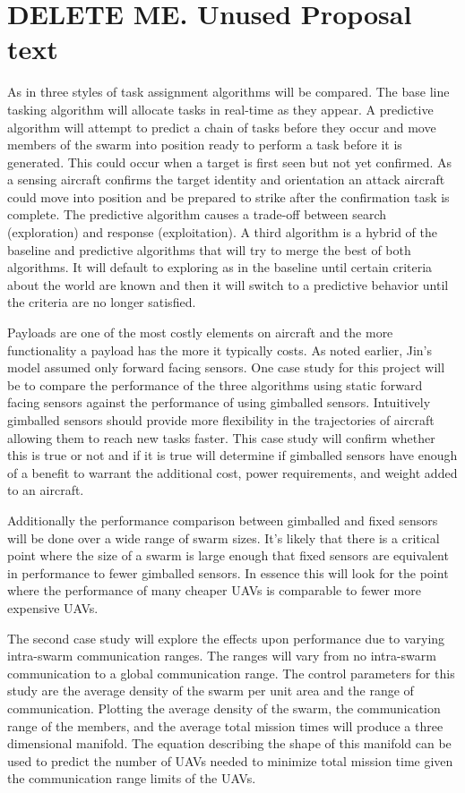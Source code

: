 \chapter{DELETE ME. Unused Proposal text}

As in \cite{jin} three styles of task assignment algorithms will be compared.  The base line tasking algorithm will allocate tasks in real-time as they appear.   A predictive algorithm will attempt to predict a chain of tasks before they occur and move members of the swarm into position ready to perform a task before it is generated.  This could occur when a target is first seen but not yet confirmed.   As a sensing aircraft confirms the target identity and orientation an attack aircraft could move into position and be prepared to strike after the confirmation task is complete.  The predictive algorithm causes a trade-off between search (exploration) and response (exploitation).  A third algorithm is a hybrid of the baseline and predictive algorithms that will try to merge the best of both algorithms.  It will default to exploring as in the baseline until certain criteria about the world are known and then it will switch to a predictive behavior until the criteria are no longer satisfied.

Payloads are one of the most costly elements on aircraft and the more functionality a payload has the more it typically costs.  As noted earlier, Jin’s model assumed only forward facing sensors.  One case study for this project will be to compare the performance of the three algorithms using static forward facing sensors against the performance of using gimballed sensors.  Intuitively gimballed sensors should provide more flexibility in the trajectories of aircraft allowing them to reach new tasks faster.  This case study will confirm whether this is true or not and if it is true will determine if gimballed sensors have enough of a benefit to warrant the additional cost, power requirements, and weight added to an aircraft.  

Additionally the performance comparison between gimballed and fixed sensors will be done over a wide range of swarm sizes.  It’s likely that there is a critical point where the size of a swarm is large enough that fixed sensors are equivalent in performance to fewer gimballed sensors.  In essence this will look for the point where the performance of many cheaper UAVs is comparable to fewer more expensive UAVs.

The second case study will explore the effects upon performance due to varying intra-swarm communication ranges.  The ranges will vary from no intra-swarm communication to a global communication range.  The control parameters for this study are the average density of the swarm per unit area and the range of communication.  Plotting the average density of the swarm, the communication range of the members, and the average total mission times will produce a three dimensional manifold.  The equation describing the shape of this manifold can be used to predict the number of UAVs needed to minimize total mission time given the communication range limits of the UAVs.

